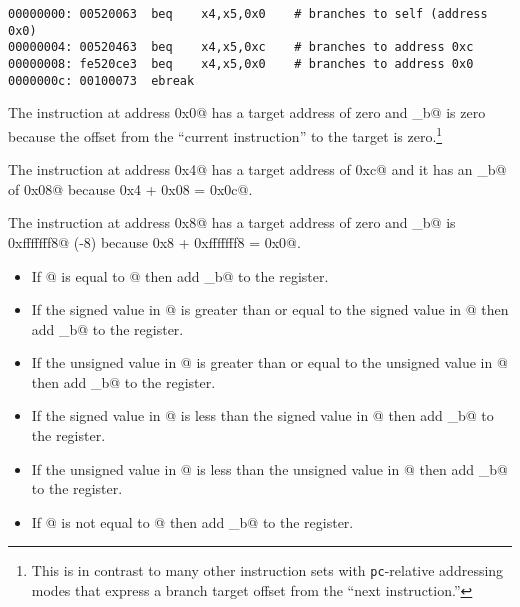 \begin{verbatim}
00000000: 00520063  beq    x4,x5,0x0    # branches to self (address 0x0)
00000004: 00520463  beq    x4,x5,0xc    # branches to address 0xc
00000008: fe520ce3  beq    x4,x5,0x0    # branches to address 0x0
0000000c: 00100073  ebreak    
\end{verbatim}

The instruction at address \verb@0x0@ has a target address of zero and
\verb@imm_b@ is zero because the offset from the ``current instruction''
to the target is zero.\footnote{This is in contrast to many other
instruction sets with {\tt pc}-relative addressing modes that express
a branch target offset from the ``next instruction.''}

The instruction at address \verb@0x4@ has a target address of \verb@0xc@
and it has an \verb@imm_b@ of \verb@0x08@ because \verb@0x4 + 0x08 = 0x0c@.

The instruction at address \verb@0x8@ has a target address of zero and
\verb@imm_b@ is \verb@0xfffffff8@ (-8) because \verb@0x8 + 0xfffffff8 = 0x0@.

\begin{itemize}
\item{}
\label{insn:beq}

If @ is equal to @ then add \verb@imm_b@ to the 
\verb@pc@ register.

\item{}
\label{insn:bge}

If the signed value in @ is greater than or equal to the 
signed value in @ then add \verb@imm_b@ to the 
\verb@pc@ register.

\item{}
\label{insn:bgeu}

If the unsigned value in @ is greater than or equal to the 
unsigned value in @ then add \verb@imm_b@ to the 
\verb@pc@ register.

\item{}
\label{insn:blt}

If the signed value in @ is less than the 
signed value in @ then add \verb@imm_b@ to the 
\verb@pc@ register.

\item{}
\label{insn:bltu}

If the unsigned value in @ is less than the 
unsigned value in @ then add \verb@imm_b@ to the 
\verb@pc@ register.

\item{}
\label{insn:bne}

If @ is not equal to @ then add \verb@imm_b@ to the 
\verb@pc@ register.

\end{itemize}

